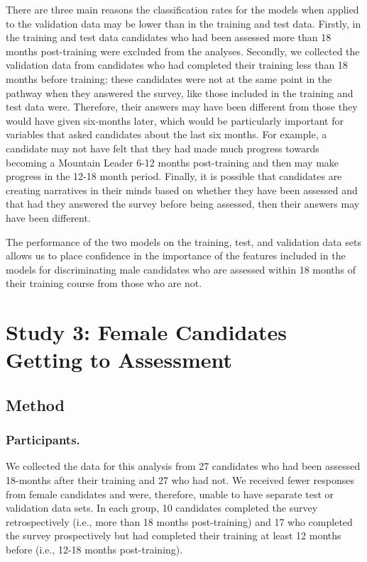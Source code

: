 \documentclass[
  12pt,
  a4paper,
]{book}
\begin{document}
There are three main reasons the classification rates for the models when applied to the validation data may be lower than in the training and test data. Firstly, in the training and test data candidates who had been assessed more than 18 months post-training were excluded from the analyses. Secondly, we collected the validation data from candidates who had completed their training less than 18 months before training; these candidates were not at the same point in the pathway when they answered the survey, like those included in the training and test data were. Therefore, their answers may have been different from those they would have given six-months later, which would be particularly important for variables that asked candidates about the last six months. For example, a candidate may not have felt that they had made much progress towards becoming a Mountain Leader 6-12 months post-training and then may make progress in the 12-18 month period. Finally, it is possible that candidates are creating narratives in their minds based on whether they have been assessed and that had they answered the survey before being assessed, then their answers may have been different.

The performance of the two models on the training, test, and validation data sets allows us to place confidence in the importance of the features included in the models for discriminating male candidates who are assessed within 18 months of their training course from those who are not.

\hypertarget{female-gta}{%
\section{Study 3: Female Candidates Getting to Assessment}\label{female-gta}}

\hypertarget{female-gta-method}{%
\subsection{Method}\label{female-gta-method}}

\hypertarget{female-gta-participants}{%
\subsubsection{Participants.}\label{female-gta-participants}}

We collected the data for this analysis from 27 candidates who had been assessed 18-months after their training and 27 who had not. We received fewer responses from female candidates and were, therefore, unable to have separate test or validation data sets. In each group, 10 candidates completed the survey retrospectively (i.e., more than 18 months post-training) and 17 who completed the survey prospectively but had completed their training at least 12 months before (i.e., 12-18 months post-training).
\end{document}
